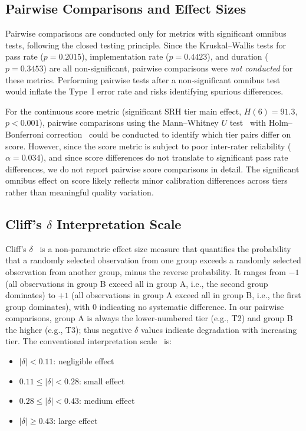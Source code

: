 \documentclass[11pt]{article}
\begin{document}
\subsection{Pairwise Comparisons and Effect Sizes}

Pairwise comparisons are conducted only for metrics with significant omnibus
tests, following the closed testing principle. Since the Kruskal--Wallis tests
for pass rate ($p=0.2015$), implementation rate ($p=0.4423$), and duration
($p=0.3453$) are all non-significant, pairwise comparisons were \emph{not
conducted} for these metrics. Performing pairwise tests after a non-significant
omnibus test would inflate the Type~I error rate and risks identifying spurious
differences.

For the continuous score metric (significant SRH tier main effect, $H(6)=91.3$,
$p<0.001$), pairwise comparisons using the Mann--Whitney $U$
test~\cite{mann1947test} with Holm--Bonferroni correction~\cite{holm1979simple}
could be conducted to identify which tier pairs differ on score. However, since
the score metric is subject to poor inter-rater reliability ($\alpha = 0.034$),
and since score differences do not translate to significant pass rate
differences, we do not report pairwise score comparisons in detail. The
significant omnibus effect on score likely reflects minor calibration
differences across tiers rather than meaningful quality variation.

\subsection{Cliff's $\delta$ Interpretation Scale}

Cliff's $\delta$~\cite{cliff1993dominance, vargha2000critique} is a non-parametric effect size
measure that quantifies the probability that a randomly selected observation
from one group exceeds a randomly selected observation from another group,
minus the reverse probability. It ranges from $-1$ (all observations in
group B exceed all in group A, i.e., the second group dominates) to $+1$
(all observations in group A exceed all in group B, i.e., the first group
dominates), with 0 indicating no systematic difference. In our pairwise
comparisons, group A is always the lower-numbered tier (e.g., T2) and group
B the higher (e.g., T3); thus negative $\delta$ values indicate degradation
with increasing tier. The conventional interpretation
scale~\cite{romano2006appropriate} is:

\begin{itemize}
  \item $|\delta| < 0.11$: negligible effect
  \item $0.11 \leq |\delta| < 0.28$: small effect
  \item $0.28 \leq |\delta| < 0.43$: medium effect
  \item $|\delta| \geq 0.43$: large effect
\end{itemize}
\end{document}
